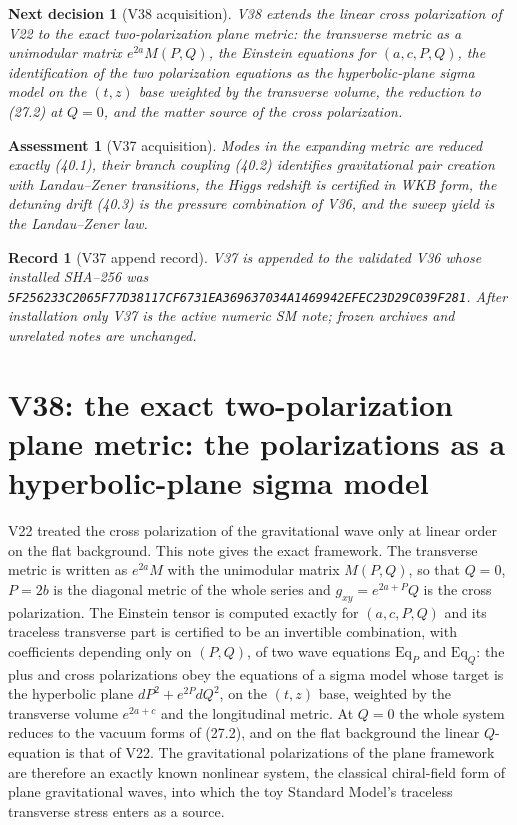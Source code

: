 \documentclass[11pt]{article}
\newtheorem{decision}[theorem]{Next decision}
\newtheorem{assessment}[theorem]{Assessment}
\newtheorem{record}[theorem]{Record}
\theoremstyle{remark}
\begin{document}
\begin{decision}[V38 acquisition]
\label{dec:v20v37-next}
V38 extends the linear cross polarization of V22 to the exact
two-polarization plane metric: the transverse metric as a unimodular
matrix \(e^{2a}M(P,Q)\), the Einstein equations for \((a,c,P,Q)\),
the identification of the two polarization equations as the
hyperbolic-plane sigma model on the \((t,z)\) base weighted by the
transverse volume, the reduction to (27.2) at \(Q=0\), and the
matter source of the cross polarization.
\end{decision}

\begin{assessment}[V37 acquisition]
\label{ass:v20v37}
Modes in the expanding metric are reduced exactly (40.1), their
branch coupling (40.2) identifies gravitational pair creation with
Landau--Zener transitions, the Higgs redshift is certified in WKB
form, the detuning drift (40.3) is the pressure combination of V36,
and the sweep yield is the Landau--Zener law.
\end{assessment}

\begin{record}[V37 append record]
\label{rec:v20v37}
V37 is appended to the validated V36 whose installed SHA--256 was
\texttt{5F256233C2065F77D38117CF6731EA369637034A1469942EFEC23D29C039F281}.
After installation only V37 is the active numeric SM note; frozen
archives and unrelated notes are unchanged.
\end{record}


\section{V38: the exact two-polarization plane metric: the polarizations as a hyperbolic-plane sigma model}
\label{sec:v20v38}

V22 treated the cross polarization of the gravitational wave only
at linear order on the flat background.  This note gives the exact
framework.  The transverse metric is written as \(e^{2a}M\) with the
unimodular matrix \(M(P,Q)\), so that \(Q=0\), \(P=2b\) is the diagonal
metric of the whole series and \(g_{xy}=e^{2a+P}Q\) is the cross
polarization.  The Einstein tensor is computed exactly for
\((a,c,P,Q)\) and its traceless transverse part is certified to be an
invertible combination, with coefficients depending only on
\((P,Q)\), of two wave equations \(\mathrm{Eq}_P\) and \(\mathrm{Eq}_Q\):
the plus and cross polarizations obey the equations of a sigma model
whose target is the hyperbolic plane \(dP^2+e^{2P}dQ^2\), on the
\((t,z)\) base, weighted by the transverse volume \(e^{2a+c}\) and
the longitudinal metric.  At \(Q=0\) the whole system reduces to the
vacuum forms of (27.2), and on the flat background the linear
\(Q\)-equation is that of V22.  The gravitational polarizations of
the plane framework are therefore an exactly known nonlinear
system, the classical chiral-field form of plane gravitational
waves, into which the toy Standard Model's traceless transverse
stress enters as a source.
\end{document}
